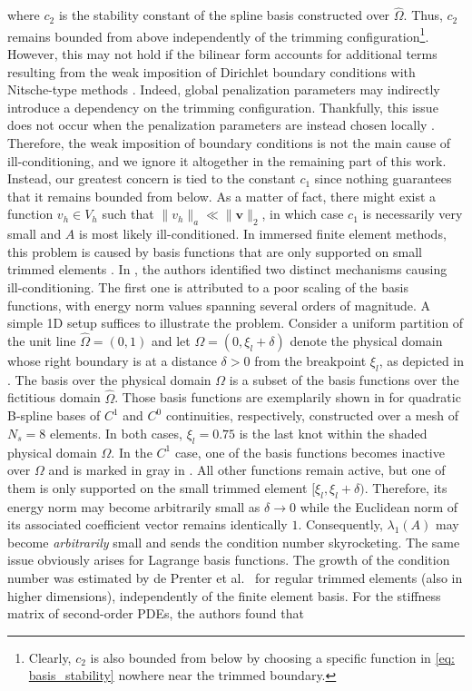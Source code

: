 \documentclass{article}
\numberwithin{equation}{section}
\theoremstyle{definition}
\begin{document}
where $c_2$ is the stability constant of the spline basis constructed over $\widehat{\Omega}$. Thus, $c_2$ remains bounded from above independently of the trimming configuration\footnote{Clearly, $c_2$ is also bounded from below by choosing a specific function in \eqref{eq: basis_stability} nowhere near the trimmed boundary.}. However, this may not hold if the bilinear form accounts for additional terms resulting from the weak imposition of Dirichlet boundary conditions with Nitsche-type methods \cite{de2017condition}. Indeed, global penalization parameters may indirectly introduce a dependency on the trimming configuration. Thankfully, this issue does not occur when the penalization parameters are instead chosen locally \cite{de2017condition}. Therefore, the weak imposition of boundary conditions is not the main cause of ill-conditioning, and we ignore it altogether in the remaining part of this work. Instead, our greatest concern is tied to the constant $c_1$ since nothing guarantees that it remains bounded from below. As a matter of fact, there might exist a function $v_h \in V_h$ such that $\|v_h\|_a \ll \|\bm{v}\|_2$, in which case $c_1$ is necessarily very small and $A$ is most likely ill-conditioned. In immersed finite element methods, this problem is caused by basis functions that are only supported on small trimmed elements \cite{de2023stability}. In \cite{de2017condition}, the authors identified two distinct mechanisms causing ill-conditioning. The first one is attributed to a poor scaling of the basis functions, with energy norm values spanning several orders of magnitude. A simple 1D setup suffices to illustrate the problem. Consider a uniform partition of the unit line $\widehat{\Omega}=(0,1)$ and let $\Omega=(0,\xi_l+\delta)$ denote the physical domain whose right boundary is at a distance $\delta > 0$ from the breakpoint $\xi_l$, as depicted in . The basis over the physical domain $\Omega$ is a subset of the basis functions over the fictitious domain $\widehat{\Omega}$. Those basis functions are exemplarily shown in  for quadratic B-spline bases of $C^1$ and $C^0$ continuities, respectively, constructed over a mesh of $N_s=8$ elements. In both cases, $\xi_l=0.75$ is the last knot within the shaded physical domain $\Omega$. In the $C^1$ case, one of the basis functions becomes inactive over $\Omega$ and is marked in gray in . All other functions remain active, but one of them is only supported on the small trimmed element $[\xi_l, \xi_l+\delta)$. Therefore, its energy norm may become arbitrarily small as $\delta \to 0$ while the Euclidean norm of its associated coefficient vector remains identically $1$. Consequently, $\lambda_1(A)$ may become \emph{arbitrarily} small and sends the condition number skyrocketing. The same issue obviously arises for Lagrange basis functions. The growth of the condition number was estimated by de Prenter et al.\ \cite{de2017condition} for regular trimmed elements (also in higher dimensions), independently of the finite element basis. For the stiffness matrix of second-order PDEs, the authors found that
\end{document}
